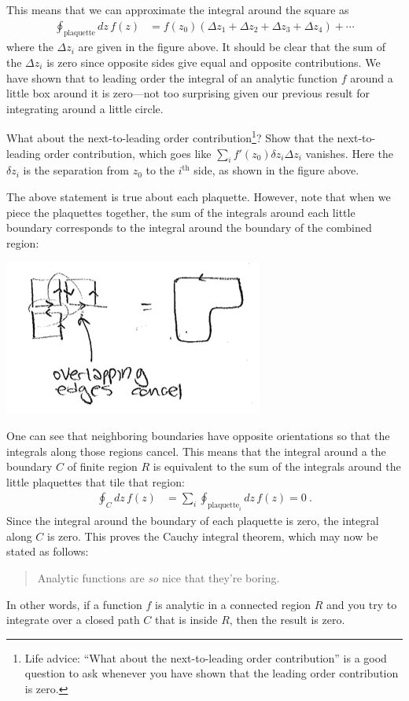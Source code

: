 This means that we can approximate the integral around the square as
\begin{align}
  \oint_\text{plaquette} dz\,  f(z)
  &= 
  f(z_0)
  \left(
    \Delta z_1 + \Delta z_2 + \Delta z_3 + \Delta z_4
  \right)
  + \cdots
\end{align}
where the $\Delta z_i$ are given in the figure above. It should be clear that the sum of the $\Delta z_i$ is zero since opposite sides give equal and opposite contributions. We have shown that to leading order the integral of an analytic function $f$ around a little box around it is zero---not too surprising given our previous result for integrating around a little circle. 
\begin{exercise}
What about the next-to-leading order contribution\footnote{Life advice: ``What about the next-to-leading order contribution'' is a good question to ask whenever you have shown that the leading order contribution is zero.}? Show that the next-to-leading order contribution, which goes like $\sum_i f'(z_0)\delta z_i \Delta z_i$ vanishes. Here the $\delta z_i$ is the separation from $z_0$ to the $i^\text{th}$ side, as shown in the figure above. 
\end{exercise}
The above statement is true about each plaquette. However, note that when we piece the plaquettes together, the sum of the integrals around each little boundary corresponds to the integral around the boundary of the combined region:
\begin{center}
\includegraphics[width=.4\textwidth]{figures/Lec_2017_plaqses.png}
\end{center}
One can see that neighboring boundaries have opposite orientations so that the integrals along those regions cancel. 
%
This means that the integral around a the boundary $C$ of finite region $R$ is equivalent to the sum of the integrals around the little plaquettes that tile that region:
\begin{align}
  \oint_C dz\, f(z) &= \sum_i \oint_{\text{plaquette}_i} dz\, f(z) = 0 \ .
\end{align}
Since the integral around the boundary of each plaquette is zero, the integral along $C$ is zero. This proves the Cauchy integral theorem, which may now be stated as follows:
\begin{quote}
Analytic functions are \emph{so} nice that they're boring.
\end{quote}
In other words, if a function $f$ is analytic in a connected region $R$ and you try to integrate over a closed path $C$ that is inside $R$, then the result is zero. 



